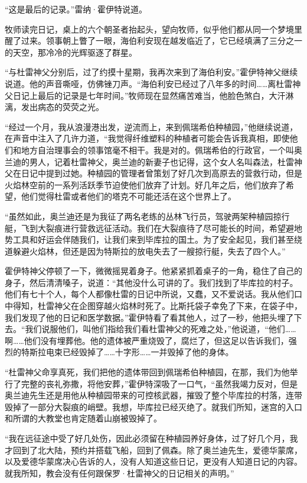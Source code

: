 \documentclass[AutoFakeBold=true]{book}
\begin{document}
\vspace*{1em}

``这是最后的记录。''雷纳·霍伊特说道。

牧师读完日记，桌上的六个朝圣者抬起头，望向牧师，似乎他们都从同一个梦境里醒了过来。领事朝上瞥了一眼，海伯利安现在越发临近了，它已经填满了三分之一的天空，那冷冷的光辉驱逐了群星。

``与杜雷神父分别后，过了约摸十星期，我再次来到了海伯利安。''霍伊特神父继续说道。他的声音嘶哑，仿佛锉刀声。``海伯利安已经过了八年多的时间……离杜雷神父日记上最后的记录是七年时间。''牧师现在显然痛苦难当，他脸色煞白，大汗淋漓，发出病态的荧荧之光。

``经过一个月，我从浪漫港出发，逆流而上，来到佩瑞希伯种植园，''他继续说道，在声音中注入了几许力道，``我觉得纤维塑料的种植者可能会告诉我真相，即使他们和地方自治理事会的领事馆毫不相干。我是对的。佩瑞希伯的行政官，一个叫奥兰迪的男人，记着杜雷神父，奥兰迪的新妻子也记得，这个女人名叫森法，杜雷神父在日记中提到过她。种植园的管理者曾策划了好几次到高原去的营救行动，但是火焰林空前的一系列活跃季节迫使他们放弃了计划。好几年之后，他们放弃了希望，他们觉得杜雷或者他们的塔克不可能还活在这个世界上了。

``虽然如此，奥兰迪还是为我征了两名老练的丛林飞行员，驾驶两架种植园掠行艇，飞到大裂痕进行营救远征活动。我们在大裂痕待了尽可能长的时间，希望避地势工具和好运会伴随我们，让我们来到毕库拉的国土。为了安全起见，我们甚至绕道躲避火焰林，但还是因为特斯拉的放电失去了一艘掠行艇，失去了四个人。''

霍伊特神父停顿了一下，微微摇晃着身子。他紧紧抓着桌子的一角，稳住了自己的身子，然后清清嗓子，说道：``其他没什么可讲的了。我们找到了毕库拉的村子。他们有七十个人，每个人都像杜雷的日记中所说，又蠢，又不爱说话。我从他们口中得知，杜雷神父在企图穿越火焰林时死了。比斯托袋子幸免了下来，在袋子中，我们发现了他的日记和医学数据。''霍伊特看了看其他人，过了一秒，他把头埋了下去。``我们说服他们，叫他们指给我们看杜雷神父的死难之处，''他说道，``他们……啊……他们没有埋葬他。他的遗体被严重烧毁了，腐烂了，但这足以告诉我们，强烈的特斯拉电束已经毁掉了……十字形……一并毁掉了他的身体。

``杜雷神父命享真死，我们把他的遗体带回到佩瑞希伯种植园，在那，我们为他举行了完整的丧礼弥撒，将他安葬，''霍伊特深吸了一口气，``虽然我竭力反对，但是奥兰迪先生还是用他从种植园带来的可控核武器，摧毁了整个毕库拉的村落，连带毁掉了一部分大裂痕的峭壁。我想，毕库拉已经灭绝了。就我们所知，迷宫的入口和所谓的大教堂也肯定随着山崩被毁掉了。

``我在远征途中受了好几处伤，因此必须留在种植园养好身体，过了好几个月，我才回到了北大陆，预约并搭载飞船，回到了佩森。除了奥兰迪先生，爱德华蒙席，以及爱德华蒙席决心告诉的人，没有人知道这些日记，更没有人知道日记的内容。就我所知，教会没有任何跟保罗·杜雷神父的日记相关的声明。''
\end{document}
